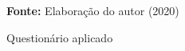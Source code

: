 \begin{figure}[ht!]
\centering

\caption{\textmd{Questionário aplicado}}
\label{fig:questionario2}

\par\medskip\textbf{Fonte:} Elaboração do autor (2020) \par\medskip

\end{figure}
